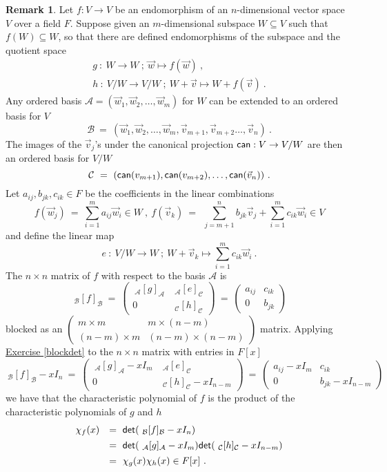 \documentclass[11pt]{amsbook}
\theoremstyle{definition}
\newtheorem{rem}[theorem]{Remark}
\begin{document}
\begin{rem} \label{charend2}
Let $f:V \to V$ be an endomorphism of an $n$-dimensional vector space $V$ over a field $F$. Suppose given an $m$-dimensional subspace $W \subseteq V$ such that $f(W) \subseteq W$, so that there are defined endomorphisms of the subspace and the quotient space
$$\begin{array}{l}
g~:~W\to W~;~ \vec{w} \mapsto f(\vec{w})~,\\[1ex]
h~:~V/W \to V/W~;~W+\vec{v} \mapsto W+f(\vec{v})~.
\end{array}$$
Any ordered basis ${\mathcal A}=(\vec{w}_1,\vec{w}_2,\dots,\vec{w}_m)$ for $W$ can be extended to an ordered basis for $V$
$${\mathcal B}~=~(\vec{w}_1,\vec{w}_2,\dots,\vec{w}_m,\vec{v}_{m+1},\vec{v}_{m+2}\dots,\vec{v}_n)~.$$
The images of the $\vec{v}_j$'s under the canonical projection ${\sf can}:V \to V/W$
 are then an ordered basis for $V/W$
 $${\mathcal C}~=~({\sf can}({v}_{m+1}),{\sf can}(v_{m+2}),\dots,{\sf can}(\vec{v}_n))~.$$
 Let $a_{ij},b_{jk},c_{ik} \in F$ be the coefficients in the linear combinations
$$f(\vec{w}_j)~=~\sum\limits^m_{i=1} a_{ij}\vec{w}_i \in W~,~
f(\vec{v}_k)~=~~\sum\limits^n_{j=m+1} b_{jk}\vec{v}_j+\sum\limits^m_{i=1} c_{ik}\vec{w}_i \in V$$
and define the linear map
$$e~:~V/W \to W~;~W+\vec{v}_k \mapsto \sum\limits^m_{i=1} c_{ik}\vec{w}_i~.$$
The $n \times n$ matrix of $f$ with respect to the basis $\mathcal A$ is
$$~_{\mathcal B}[f]_{\mathcal B}~=~\begin{pmatrix}
~_{\mathcal A}[g]_{\mathcal A}&~_{\mathcal A}[e]_{\mathcal C}\\
0 &~_{\mathcal C}[h]_{\mathcal C}\end{pmatrix}~=~
\begin{pmatrix} a_{ij} & c_{ik} \\ 0 & b_{jk} \end{pmatrix}$$
 blocked as an $\begin{pmatrix}
m \times m & m \times (n-m)\\
(n-m) \times m & (n-m) \times (n-m)
\end{pmatrix}$  matrix. Applying \hyperref[blockdet]{Exercise \ref{blockdet}} to the $n \times n$
matrix with entries in $F[x]$
$$ ~_{\mathcal B}[f]_{\mathcal B}-xI_n~=~\begin{pmatrix}
~_{\mathcal A}[g]_{\mathcal A}-xI_m&~_{\mathcal A}[e]_{\mathcal C}\\
0 &~_{\mathcal C}[h]_{\mathcal C}-xI_{n-m}\end{pmatrix}~=~
\begin{pmatrix} a_{ij} -xI_m & c_{ik} \\ 0 & b_{jk}-xI_{n-m} \end{pmatrix}$$
we have that the characteristic polynomial of $f$ is the product of the characteristic polynomials of $g$ and $h$
$$\begin{array}{ll}
\chi_f(x)&=~{\sf det}( ~_{\mathcal B}[f]_{\mathcal B}-xI_n)\\[1ex]
&=~{\sf det}( ~_{\mathcal A}[g]_{\mathcal A}-xI_m){\sf det}( ~_{\mathcal C}[h]_{\mathcal C}-xI_{n-m})\\[1ex]
&=~\chi_g(x)\chi_h(x) \in F[x]~.
\end{array}$$
\end{rem}
\end{document}
